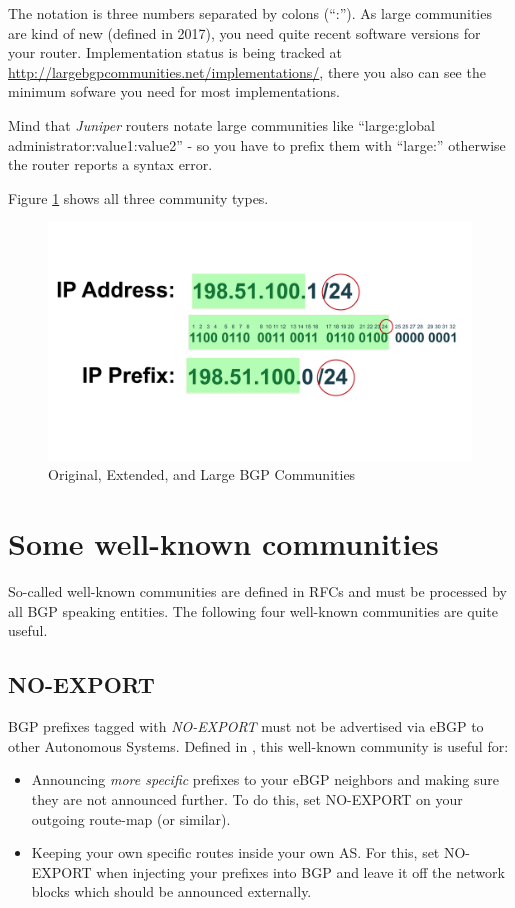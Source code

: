 The notation is three numbers separated by colons (``:''). As large communities are kind of new (defined in 2017), you need quite recent software versions for your router. Implementation status is being tracked at \url{http://largebgpcommunities.net/implementations/}, there you also can see the minimum sofware you need for most implementations.

Mind that \emph{Juniper} routers notate large communities like ``large:global administrator:value1:value2'' - so you have to prefix them with ``large:'' otherwise the router reports a syntax error.

Figure \ref{fig:communities} shows all three community types.

\begin{figure}
  \centering
  \includegraphics[width=\linewidth,page=5]{img/Drawings.pdf}
  \caption{Original, Extended, and Large BGP Communities}
  \label{fig:communities}
\end{figure}


\section{Some well-known communities}
\label{wellknown}
So-called well-known communities are defined in RFCs and must be processed by all BGP speaking entities. The following four well-known communities are quite useful.

\subsection{NO-EXPORT}
BGP prefixes tagged with \emph{NO-EXPORT} must not be advertised via eBGP to other Autonomous Systems. Defined in \cite{rfc1997}, this well-known community is useful for:
\begin{itemize}
  \item Announcing \emph{more specific} prefixes to your eBGP neighbors and making sure they are not announced further. To do this, set NO-EXPORT on your outgoing route-map (or similar).
  \item Keeping your own specific routes inside your own AS. For this, set NO-EXPORT when injecting your prefixes into BGP and leave it off the network blocks which should be announced externally.
\end{itemize}

